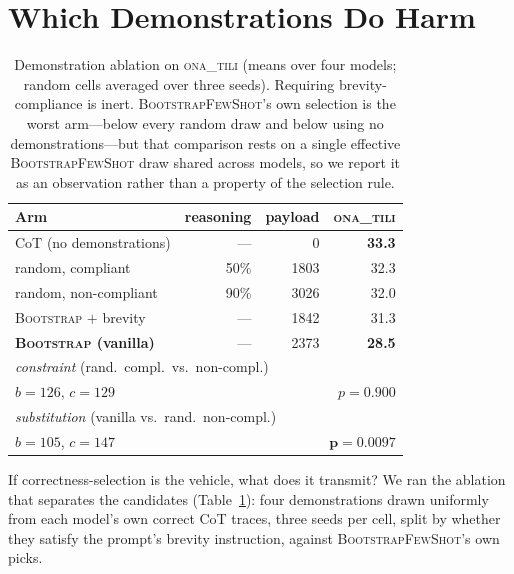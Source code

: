 \documentclass[11pt]{article}
\newcommand{\ona}{\textsc{ona\_tili}}
\newcommand{\bsfs}{\textsc{BootstrapFewShot}}
\newcommand{\bsfsS}{\textsc{Bootstrap}}   %
\begin{document}
\section{Which Demonstrations Do Harm}\label{sec:demos}

\begin{table}[t]\centering\small
\caption{Demonstration ablation on \ona{} (means over four models; random cells averaged
over three seeds). Requiring brevity-compliance is inert. \bsfs{}'s own selection is the
worst arm---below every random draw and below using no demonstrations---but that
comparison rests on a single effective \bsfs{} draw shared across models, so we report it
as an observation rather than a property of the selection rule.}
\label{tab:substitution}
\setlength{\tabcolsep}{2.5pt}
\begin{tabular}{lrrr}
\toprule
Arm & reasoning & payload & \ona{} \\
\midrule
CoT (no demonstrations) & --- & \phantom{000}0 & \textbf{33.3} \\
random, compliant       & 50\% & 1803 & 32.3 \\
random, non-compliant   & 90\% & 3026 & 32.0 \\
\bsfsS{} $+$ brevity & --- & 1842 & 31.3 \\
\textbf{\bsfsS{} (vanilla)} & --- & 2373 & \textbf{28.5} \\
\midrule
\multicolumn{4}{l}{\emph{constraint} (rand.\ compl.\ vs.\ non-compl.)}\\
\quad $b{=}126$, $c{=}129$ & \multicolumn{3}{r}{$p=0.900$} \\
\multicolumn{4}{l}{\emph{substitution} (vanilla vs.\ rand.\ non-compl.)}\\
\quad $b{=}105$, $c{=}147$ & \multicolumn{3}{r}{$\mathbf{p=0.0097}$} \\
\bottomrule
\end{tabular}
\end{table}

If correctness-selection is the vehicle, what does it transmit? We ran the ablation that
separates the candidates (Table~\ref{tab:substitution}): four demonstrations drawn
uniformly from each model's own correct CoT traces, three seeds per cell, split by
whether they satisfy the prompt's brevity instruction, against \bsfs{}'s own picks.
\end{document}
